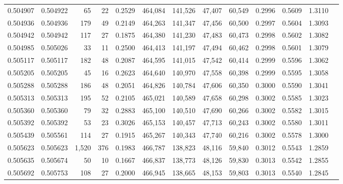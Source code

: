 \begin{tabular}{rrrrrrrrrrrrr}
0.504907 & 0.504922 &    65 &    22 &                                     0.2529 & 464,084 & 141,526 &  47,407 &  60,549 & 0.2996 & 0.5609 & 1.3110 \\
0.504936 & 0.504936 &   179 &    49 &                                     0.2149 & 464,263 & 141,347 &  47,456 &  60,500 & 0.2997 & 0.5604 & 1.3093 \\
0.504942 & 0.504942 &   117 &    27 &                                     0.1875 & 464,380 & 141,230 &  47,483 &  60,473 & 0.2998 & 0.5602 & 1.3082 \\
0.504985 & 0.505026 &    33 &    11 &                                     0.2500 & 464,413 & 141,197 &  47,494 &  60,462 & 0.2998 & 0.5601 & 1.3079 \\
0.505117 & 0.505117 &   182 &    48 &                                     0.2087 & 464,595 & 141,015 &  47,542 &  60,414 & 0.2999 & 0.5596 & 1.3062 \\
0.505205 & 0.505205 &    45 &    16 &                                     0.2623 & 464,640 & 140,970 &  47,558 &  60,398 & 0.2999 & 0.5595 & 1.3058 \\
0.505288 & 0.505288 &   186 &    48 &                                     0.2051 & 464,826 & 140,784 &  47,606 &  60,350 & 0.3000 & 0.5590 & 1.3041 \\
0.505313 & 0.505313 &   195 &    52 &                                     0.2105 & 465,021 & 140,589 &  47,658 &  60,298 & 0.3002 & 0.5585 & 1.3023 \\
0.505360 & 0.505360 &    79 &    32 &                                     0.2883 & 465,100 & 140,510 &  47,690 &  60,266 & 0.3002 & 0.5582 & 1.3015 \\
0.505392 & 0.505392 &    53 &    23 &                                     0.3026 & 465,153 & 140,457 &  47,713 &  60,243 & 0.3002 & 0.5580 & 1.3011 \\
0.505439 & 0.505561 &   114 &    27 &                                     0.1915 & 465,267 & 140,343 &  47,740 &  60,216 & 0.3002 & 0.5578 & 1.3000 \\
0.505623 & 0.505623 & 1,520 &   376 &                                     0.1983 & 466,787 & 138,823 &  48,116 &  59,840 & 0.3012 & 0.5543 & 1.2859 \\
0.505635 & 0.505674 &    50 &    10 &                                     0.1667 & 466,837 & 138,773 &  48,126 &  59,830 & 0.3013 & 0.5542 & 1.2855 \\
0.505692 & 0.505753 &   108 &    27 &                                     0.2000 & 466,945 & 138,665 &  48,153 &  59,803 & 0.3013 & 0.5540 & 1.2845 \\

\end{tabular}
